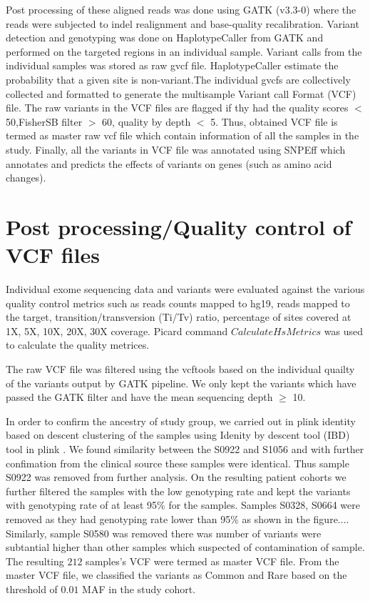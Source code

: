 Post processing of these aligned reads was done using GATK (v3.3-0) where the reads were subjected to indel realignment and base-quality recalibration. Variant detection and genotyping was done on HaplotypeCaller from GATK and performed on the targeted regions in an individual sample. Variant calls from the individual samples was stored as raw gvcf file. HaplotypeCaller estimate the probability that a given site is non-variant.The individual gvcfs are collectively collected and formatted to generate the multisample Variant call Format (VCF) file. The raw variants in the VCF files are flagged if thy had the quality scores $<$ 50,FisherSB filter $>$ 60, quality by depth $<$ 5. Thus, obtained VCF file is termed as master raw vcf file which contain information of all the samples in the study. Finally, all the variants in VCF file was annotated using SNPEff \cite {cingolani2012program} which annotates and predicts the effects of variants on genes (such as amino acid changes).

\section{Post processing/Quality control of VCF files}

Individual exome sequencing data and variants were evaluated against the various quality control metrics such as reads counts mapped to hg19, reads mapped to the target, transition/transversion (Ti/Tv) ratio, percentage of sites covered at 1X, 5X, 10X, 20X, 30X coverage. Picard command $CalculateHsMetrics$ was used to calculate the quality metrices.  

The raw VCF file was filtered using the vcftools\cite{danecek2011variant} based on the individual quailty of the variants output by GATK pipeline. We only kept the variants which have passed the GATK filter and have the mean sequencing depth $\geq$ 10.  

In order to confirm the ancestry of study group, we carried out in plink identity based on descent clustering  of the samples using Idenity by descent tool (IBD) tool in plink \cite{purcell2007plink}. We found similarity between the S0922 and S1056 and with further confimation from the clinical source these samples were identical. Thus sample S0922 was removed from further analysis. On the resulting patient cohorts we further filtered the samples with the low genotyping rate and kept the variants with genotyping rate of at least 95\% for the samples. Samples S0328, S0664 were removed as they had genotyping rate lower than 95\% as shown in the figure.... Similarly, sample S0580 was removed there was number of variants were subtantial higher than other samples which suspected of contamination of sample. The resulting $212$ samples's VCF were termed as master VCF file. From the master VCF file, we classified the variants as Common and Rare based on the threshold of $0.01$ MAF in the study cohort.  

